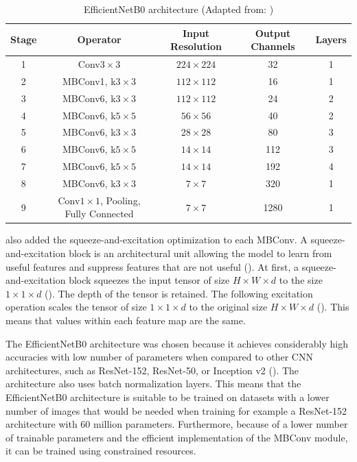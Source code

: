 \documentclass{BachelorBUI}
\begin{document}
    \begin{table}[h]
        \centering
        \begin{tabular}{c|c|c|c|c}
            \hline
            Stage & Operator & Input Resolution & Output Channels & Layers \\
            \hline
            1 & Conv$3\times3$ & $224 \times 224$ & 32 & 1 \\
            2 & MBConv1, k$3\times3$ & $112 \times 112$ & 16 & 1 \\
            3 & MBConv6, k$3\times3$ & $112 \times 112$ & 24 & 2 \\
            4 & MBConv6, k$5\times5$ & $56 \times 56$ & 40 & 2 \\
            5 & MBConv6, k$3\times3$ & $28 \times 28$ & 80 & 3 \\
            6 & MBConv6, k$5\times5$ & $14 \times 14$ & 112 & 3 \\
            7 & MBConv6, k$5\times5$ & $14 \times 14$ & 192 & 4 \\
            8 & MBConv6, k$3\times3$ & $7 \times 7$ & 320 & 1 \\
            9 & Conv$1\times1$, Pooling, Fully Connected & $7 \times 7$ & 1280 & 1 \\
            \hline
        \end{tabular}
        \caption{\centering EfficientNetB0 architecture (Adapted from: \cite{Tan:2019})}
        \label{fig:efficientb0-architecture}
    \end{table}

    \textcite{Tan:2019} also added the squeeze-and-excitation optimization to each MBConv. A squeeze-and-excitation block is an architectural unit allowing the model to learn from useful features and suppress features that are not useful (\cite{Hu:2019}). At first, a squeeze-and-excitation block squeezes the input tensor of size $H \times W \times d$ to the size $1 \times 1 \times d$ (\cite{Hu:2019}). The depth of the tensor is retained. The following excitation operation scales the tensor of size $1 \times 1 \times d$ to the original size $H \times W \times d$ (\cite{Hu:2019}). This means that values within each feature map are the same.

    The EfficientNetB0 architecture was chosen because it achieves considerably high accuracies with low number of parameters when compared to other CNN architectures, such as ResNet-152, ResNet-50, or Inception v2 (\cite{Tan:2019}). The architecture also uses batch normalization layers. This means that the EfficientNetB0 architecture is suitable to be trained on datasets with a lower number of images that would be needed when training for example a ResNet-152 architecture with 60 million parameters. Furthermore, because of a lower number of trainable parameters and the efficient implementation of the MBConv module, it can be trained using constrained resources.
\end{document}
